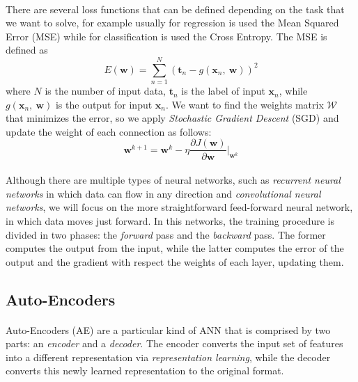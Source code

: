 \paragraph{}
There are several loss functions that can be defined depending on the task that we want to solve, for example usually for regression is used the Mean Squared Error (MSE) while for classification is used the Cross Entropy. The MSE is defined as
\begin{equation}
\label{eq:MSE}
    E(\textbf{w}) = \sum_{n=1}^N (\textbf{t}_n - g(\textbf{x}_n,\ \textbf{w}))^2
\end{equation}
where $N$ is the number of input data, $\textbf{t}_n$ is the label of input $\textbf{x}_n$, while $g(\textbf{x}_n,\ \textbf{w})$ is the output for input $\textbf{x}_n$. \newline
We want to find the weights matrix $\mathcal{W}$ that minimizes the error, so we apply \textit{Stochastic Gradient Descent} (SGD) and update the weight of each connection as follows:
\begin{equation}
    \textbf{w}^{k+1} = \textbf{w}^k - \eta \frac{\partial J(\textbf{w})}{\partial \textbf{w}}\bigg|_{\textbf{w}^k}
\end{equation}

\paragraph{}
Although there are multiple types of neural networks, such as \textit{recurrent neural networks} in which data can flow in any direction and \textit{convolutional neural networks}, we will focus on the more straightforward feed-forward neural network, in which data moves just forward.
In this networks, the training procedure is divided in two phases: the \textit{forward} pass and the \textit{backward} pass. The former computes the output from the input, while the latter computes the error of the output and the gradient with respect the weights of each layer, updating them.

\subsection{Auto-Encoders}
\label{subsec:ae}
\paragraph{}
Auto-Encoders (AE) are a particular kind of ANN that is comprised by two parts: an \textit{encoder} and a \textit{decoder}. The encoder converts the input set of features into a different representation via \textit{representation learning}, while the decoder converts this newly learned representation to the original format. 

